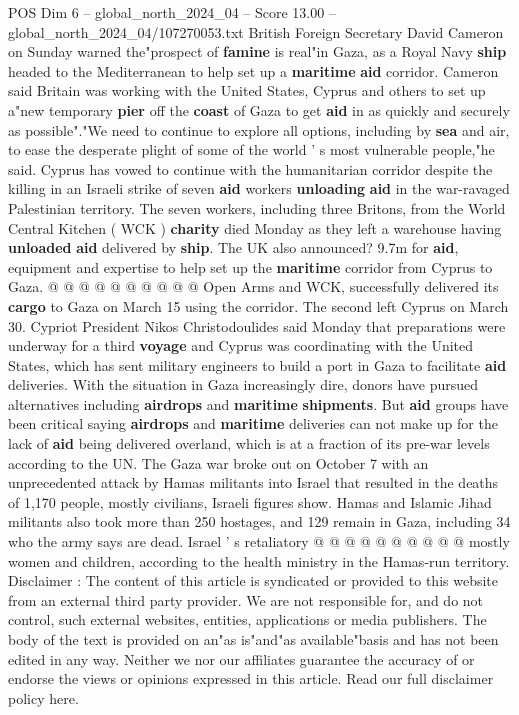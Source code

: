 \begin{textsample}{POS Dim 6 – global\_north\_2024\_04 – Score 13.00 – global\_north\_2024\_04/107270053.txt}  \label{ex:f6_pos_071}
British Foreign Secretary David Cameron on Sunday warned the"prospect of \textbf{famine} is real"in Gaza, as a Royal Navy \textbf{ship} headed to the Mediterranean to help set up a \textbf{maritime} \textbf{aid} corridor.
Cameron said Britain was working with the United States, Cyprus and others to set up a"new temporary \textbf{pier} off the \textbf{coast} of Gaza to get \textbf{aid} in as quickly and securely as possible"."We need to continue to explore all options, including by \textbf{sea} and air, to ease the desperate plight of some of the world ' s most vulnerable people,"he said.
Cyprus has vowed to continue with the humanitarian corridor despite the killing in an Israeli strike of seven \textbf{aid} workers \textbf{unloading} \textbf{aid} in the war-ravaged Palestinian territory.
The seven workers, including three Britons, from the World Central Kitchen ( WCK ) \textbf{charity} died Monday as they left a warehouse having \textbf{unloaded} \textbf{aid} delivered by \textbf{ship}.
The UK also announced? 9.7m for \textbf{aid}, equipment and expertise to help set up the \textbf{maritime} corridor from Cyprus to Gaza. @ @ @ @ @ @ @ @ @ @ Open Arms and WCK, successfully delivered its \textbf{cargo} to Gaza on March 15 using the corridor.
The second left Cyprus on March 30.
Cypriot President Nikos Christodoulides said Monday that preparations were underway for a third \textbf{voyage} and Cyprus was coordinating with the United States, which has sent military engineers to build a port in Gaza to facilitate \textbf{aid} deliveries.
With the situation in Gaza increasingly dire, donors have pursued alternatives including \textbf{airdrops} and \textbf{maritime} \textbf{shipments}.
But \textbf{aid} groups have been critical saying \textbf{airdrops} and \textbf{maritime} deliveries can not make up for the lack of \textbf{aid} being delivered overland, which is at a fraction of its pre-war levels according to the UN.
The Gaza war broke out on October 7 with an unprecedented attack by Hamas militants into Israel that resulted in the deaths of 1,170 people, mostly civilians, Israeli figures show.
Hamas and Islamic Jihad militants also took more than 250 hostages, and 129 remain in Gaza, including 34 who the army says are dead.
Israel ' s retaliatory @ @ @ @ @ @ @ @ @ @ mostly women and children, according to the health ministry in the Hamas-run territory.
Disclaimer : The content of this article is syndicated or provided to this website from an external third party provider.
We are not responsible for, and do not control, such external websites, entities, applications or media publishers.
The body of the text is provided on an"as is"and"as available"basis and has not been edited in any way.
Neither we nor our affiliates guarantee the accuracy of or endorse the views or opinions expressed in this article.
Read our full disclaimer policy here.

\end{textsample}
